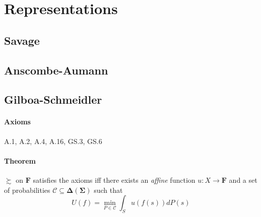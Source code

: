 \documentclass[landscape, 12pt]{extarticle}
\begin{document}
\clearpage

\section{Representations}

\begin{multicols}{2}
	\subsection{Savage}
	\subsection{Anscombe-Aumann}
	\subsection{Gilboa-Schmeidler}

	\paragraph{Axioms} A.1, A.2, A.4, A.16, GS.3, GS.6

	\paragraph{Theorem}
	$\succsim$ on $\bm F$ satisfies the axioms iff there exists an \textit{affine} function
	$u: X \to \bm F$ and a set of probabilities $\mathcal C \subseteq \bm \Delta(\bm \Sigma)$
	such that
	\[
		U(f) = \min_{P\in \mathcal C} \int_S u(f(s)) dP(s)
	\]
\end{multicols}
\end{document}
